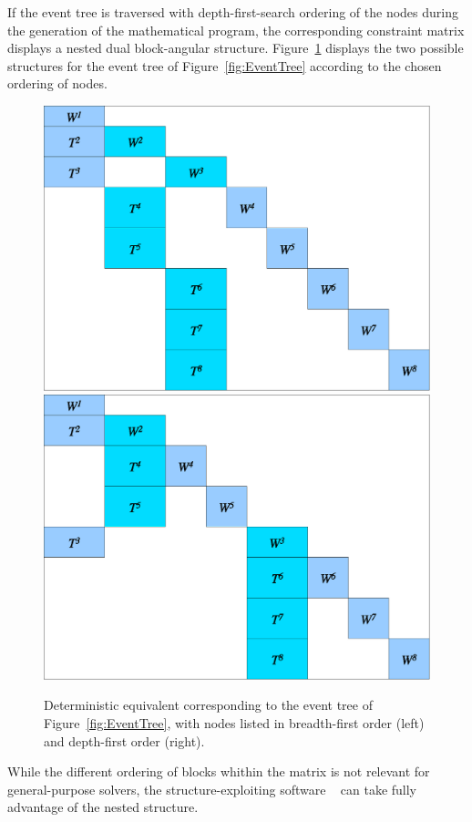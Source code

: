 If the event tree is traversed with depth-first-search ordering of the 
nodes during the generation of the mathematical program, the 
corresponding constraint matrix displays a nested dual block-angular 
structure.
Figure~\ref{fig:deteq} displays the two possible structures 
for the event tree of Figure~\ref{fig:EventTree} according 
to the chosen ordering of nodes.
%
\begin{figure}[ht]
  \begin{center}
    \includegraphics[scale=0.36]{figures/deteq-bfs.eps} \hspace{1cm}
    \includegraphics[scale=0.36]{figures/deteq-dfs.eps}
    \caption{Deterministic equivalent corresponding to the event tree 
             of Figure~\ref{fig:EventTree}, with nodes listed in breadth-first 
             order (left) and depth-first order (right).}
    \label{fig:deteq}
  \end{center}
  \vspace{-3ex}
\end{figure}
%
While the different ordering of blocks whithin the matrix is not 
relevant for general-purpose solvers, the
structure-exploiting software \OOPS\ \cite{GondzioSarkissian} can take 
fully advantage of the nested structure.

